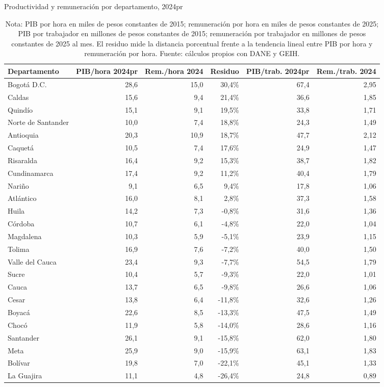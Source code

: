 \begin{table}[H]
\centering
\caption{Productividad y remuneración por departamento, 2024pr}
\label{tab:dept_productividad_remuneracion_24}
\scriptsize
\begin{tabular}{lrrrrr}
\toprule
Departamento & PIB/hora 2024pr & Rem./hora 2024 & Residuo & PIB/trab. 2024pr & Rem./trab. 2024 \\
\midrule
Bogotá D.C. & 28,6 & 15,0 & 30,4\% & 67,4 & 2,95 \\
Caldas & 15,6 & 9,4 & 21,4\% & 36,6 & 1,85 \\
Quindío & 15,1 & 9,1 & 19,5\% & 33,8 & 1,71 \\
Norte de Santander & 10,0 & 7,4 & 18,8\% & 24,3 & 1,49 \\
Antioquia & 20,3 & 10,9 & 18,7\% & 47,7 & 2,12 \\
Caquetá & 10,5 & 7,4 & 17,6\% & 24,9 & 1,47 \\
Risaralda & 16,4 & 9,2 & 15,3\% & 38,7 & 1,82 \\
Cundinamarca & 17,4 & 9,2 & 11,2\% & 40,4 & 1,79 \\
Nariño & 9,1 & 6,5 & 9,4\% & 17,8 & 1,06 \\
Atlántico & 16,0 & 8,1 & 2,8\% & 37,3 & 1,58 \\
Huila & 14,2 & 7,3 & -0,8\% & 31,6 & 1,36 \\
Córdoba & 10,7 & 6,1 & -4,8\% & 22,0 & 1,04 \\
Magdalena & 10,3 & 5,9 & -5,1\% & 23,9 & 1,15 \\
Tolima & 16,9 & 7,6 & -7,2\% & 40,0 & 1,50 \\
Valle del Cauca & 23,4 & 9,3 & -7,7\% & 54,5 & 1,79 \\
Sucre & 10,4 & 5,7 & -9,3\% & 22,0 & 1,01 \\
Cauca & 13,7 & 6,5 & -9,8\% & 26,6 & 1,06 \\
Cesar & 13,8 & 6,4 & -11,8\% & 32,6 & 1,26 \\
Boyacá & 22,6 & 8,5 & -13,3\% & 47,5 & 1,49 \\
Chocó & 11,9 & 5,8 & -14,0\% & 28,6 & 1,16 \\
Santander & 26,1 & 9,1 & -15,8\% & 62,0 & 1,80 \\
Meta & 25,9 & 9,0 & -15,9\% & 63,1 & 1,83 \\
Bolívar & 19,8 & 7,0 & -22,1\% & 45,1 & 1,33 \\
La Guajira & 11,1 & 4,8 & -26,4\% & 24,8 & 0,89 \\
\bottomrule
\end{tabular}
\caption*{\footnotesize Nota: PIB por hora en miles de pesos constantes de 2015; remuneración por hora en miles de pesos constantes de 2025; PIB por trabajador en millones de pesos constantes de 2015; remuneración por trabajador en millones de pesos constantes de 2025 al mes. El residuo mide la distancia porcentual frente a la tendencia lineal entre PIB por hora y remuneración por hora. Fuente: cálculos propios con DANE y GEIH.}
\end{table}